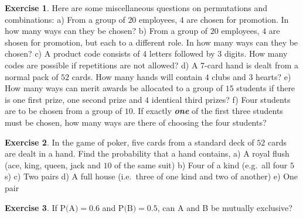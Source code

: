 \documentclass[
]{book}
\theoremstyle{definition}
\theoremstyle{definition}
\theoremstyle{definition}
\newtheorem{exercise}{Exercise}[chapter]
\theoremstyle{definition}
\theoremstyle{remark}
\begin{document}
\begin{exercise}
Here are some miscellaneous questions on permutations and combinations:
a) From a group of \(20\) employees, \(4\) are chosen for promotion. In how many ways can they be chosen?
b) From a group of \(20\) employees, \(4\) are shosen for promotion, but each to a different role. In how many ways can they be chosen?
c) A product code consists of \(4\) letters followed by \(3\) digits. How many codes are possible if repetitions are not allowed?
d) A \(7\)-card hand is dealt from a normal pack of \(52\) cards. How many hands will contain \(4\) clubs and \(3\) hearts?
e) How many ways can merit awards be allocated to a group of \(15\) students if there is one first prize, one second prize and \(4\) identical third prizes?
f) Four students are to be chosen from a group of \(10\). If exactly \textbf{\emph{one}} of the first three students must be chosen, how many ways are there of choosing the four students?
\end{exercise}

\begin{exercise}
In the game of poker, five cards from a standard deck of \(52\) cards are dealt in a hand. Find the probability that a hand contains,
a) A royal flush (ace, king, queen, jack and \(10\) of the same suit)
b) Four of a kind (e.g.~all four \(5\)s)
c) Two pairs
d) A full house (i.e.~three of one kind and two of another)
e) One pair
\end{exercise}

\begin{exercise}
If \(\text{P(A)}=0.6\) and \(\text{P(B)}=0.5\), can A and B be mutually exclusive?
\end{exercise}
\end{document}
